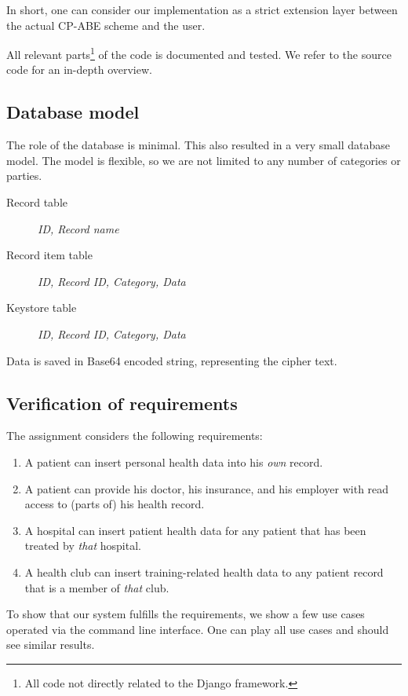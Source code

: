 \documentclass[a4paper]{article}
\begin{document}
		In short, one can consider our implementation as a strict extension layer between the actual CP-ABE scheme and the user.
				
		All relevant parts\footnote{All code not directly related to the Django framework.} of the code is documented and tested. We refer to the source code for an in-depth overview.
	
	\subsection{Database model}
		The role of the database is minimal. This also resulted in a very small database model. The model is flexible, so we are not limited to any number of categories or parties.
		
		\begin{description}
			\item[Record table]
			\textit{ID, Record name} 
			\item[Record item table]
			\textit{ID, Record ID, Category, Data} 			
			\item[Keystore table]
			\textit{ID, Record ID, Category, Data}
		\end{description}
	
		Data is saved in Base64 encoded string, representing the cipher text.
	
	\subsection{Verification of requirements}
		The assignment considers the following requirements:
		
		\begin{enumerate}
			\item{A patient can insert personal health data into his \textit{own} record.}
			\item{A patient can provide his doctor, his insurance, and his employer with read access to (parts of) his health record.}
			\item{A hospital can insert patient health data for any patient that has been treated by \textit{that} hospital.}
			\item{A health club can insert training-related health data to any patient record that is a member of \textit{that} club.}
		\end{enumerate}
		
		To show that our system fulfills the requirements, we show a few use cases operated via the command line interface. One can play all use cases and should see similar results.
		
\end{document}
